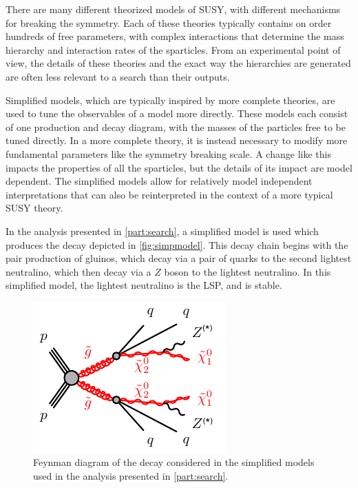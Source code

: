 There are many different theorized models of \ac{SUSY}, with different mechanisms for breaking the symmetry. Each of these theories typically contains on order hundreds of free parameters, with complex interactions that determine the mass hierarchy and interaction rates of the sparticles. From an experimental point of view, the details of these theories and the exact way the hierarchies are generated are often less relevant to a search than their outputs. 

Simplified models, which are typically inspired by more complete theories, are used to tune the observables of a model more directly. These models each consist of one production and decay diagram, with the masses of the particles free to be tuned directly. In a more complete theory, it is instead necessary to modify more fundamental parameters like the symmetry breaking scale. A change like this impacts the properties of all the sparticles, but the details of its impact are model dependent. The simplified models allow for relatively model independent interpretations that can also be reinterpreted in the context of a more typical \ac{SUSY} theory.

In the analysis presented in \autoref{part:search}, a simplified model is used which produces the decay depicted in \autoref{fig:simpmodel}. This decay chain begins with the pair production of gluinos, which decay via a pair of quarks to the second lightest neutralino, which then decay via a $Z$ boson to the lightest neutralino. In this simplified model, the lightest neutralino is the \ac{LSP}, and is stable.

\begin{centering}
\begin{figure}[!hbt]
\myfloatalign
\includegraphics[width=.9\linewidth]{figures/theory/gogo-qqqqZZN1N1.pdf}
\caption{Feynman diagram of the decay considered in the simplified models used in the analysis presented in \autoref{part:search}.}
\label{fig:simpmodel}
\end{figure}
\end{centering}

